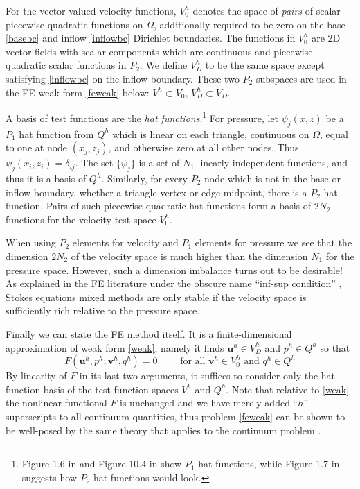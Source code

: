 \documentclass[letterpaper,final,12pt,reqno]{amsart}
\newcommand{\bu}{\mathbf{u}}
\newcommand{\bv}{\mathbf{v}}
\begin{document}
For the vector-valued velocity functions, $V_0^h$ denotes the space of \emph{pairs} of scalar piecewise-quadratic functions on $\Omega$, additionally required to be zero on the base \eqref{basebc} and inflow \eqref{inflowbc} Dirichlet boundaries.  The functions in $V_0^h$ are 2D vector fields with scalar components which are continuous and piecewise-quadratic scalar functions in $P_2$.  We define $V_D^h$ to be the same space except satisfying \eqref{inflowbc} on the inflow boundary.  These two $P_2$ subspaces are used in the FE weak form \eqref{feweak} below: $V_0^h \subset V_0$, $V_D^h \subset V_D$.

A basis of test functions are the \emph{hat functions}.\footnote{Figure 1.6 in \cite{Elmanetal2014} and Figure 10.4 in \cite{Bueler2021} show $P_1$ hat functions, while Figure 1.7 in \cite{Elmanetal2014} suggests how $P_2$ hat functions would look.}  For pressure, let $\psi_j(x,z)$ be a $P_1$ hat function from $Q^h$ which is linear on each triangle, continuous on $\Omega$, equal to one at node $(x_j,z_j)$, and otherwise zero at all other nodes.  Thus $\psi_j(x_i,z_i) = \delta_{ij}$.  The set $\{\psi_j\}$ is a set of $N_1$ linearly-independent functions, and thus it is a basis of $Q^h$.  Similarly, for every $P_2$ node which is not in the base or inflow boundary, whether a triangle vertex or edge midpoint, there is a $P_2$ hat function.  Pairs of such piecewise-quadratic hat functions form a basis of $2N_2$ functions for the velocity test space $V_0^h$.

When using $P_2$ elements for velocity and $P_1$ elements for pressure we see that the dimension $2N_2$ of the velocity space is much higher than the dimension $N_1$ for the pressure space.  However, such a dimension imbalance turns out to be desirable!  As explained in the FE literature under the obscure name ``inf-sup condition'' \cite{Braess2007,Bueler2021,Elmanetal2014}, Stokes equations mixed methods are only stable if the velocity space is sufficiently rich relative to the pressure space.

Finally we can state the FE method itself.  It is a finite-dimensional approximation of weak form \eqref{weak}, namely it finds $\bu^h \in V_D^h$ and $p^h \in Q^h$ so that
\begin{equation}
F(\bu^h,p^h;\bv^h,q^h) = 0 \qquad \text{ for all } \bv^h\in V_0^h \text{ and } q^h\in Q^h  \label{feweak}
\end{equation}
By linearity of $F$ in its last two arguments, it suffices to consider only the hat function basis of the test function spaces $V_0^h$ and $Q^h$.  Note that relative to \eqref{weak} the nonlinear functional $F$ is unchanged and we have merely added ``$h$'' superscripts to all continuum quantities, thus problem \eqref{feweak} can be shown to be well-posed by the same theory that applies to the continuum problem \cite[Theorem 4.3]{JouvetRappaz2011}.
\end{document}
